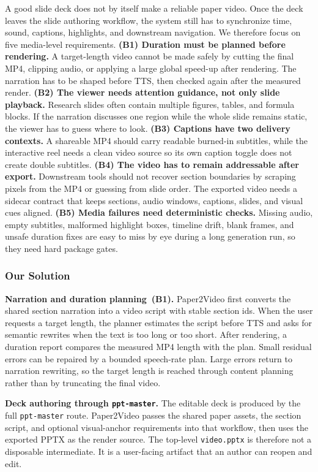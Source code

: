 \documentclass{article}
\begin{document}
A good slide deck does not by itself make a reliable paper video. Once the deck leaves the slide authoring workflow, the system still has to synchronize time, sound, captions, highlights, and downstream navigation. We therefore focus on five media-level requirements. \textbf{(B1) Duration must be planned before rendering.} A target-length video cannot be made safely by cutting the final MP4, clipping audio, or applying a large global speed-up after rendering. The narration has to be shaped before TTS, then checked again after the measured render. \textbf{(B2) The viewer needs attention guidance, not only slide playback.} Research slides often contain multiple figures, tables, and formula blocks. If the narration discusses one region while the whole slide remains static, the viewer has to guess where to look. \textbf{(B3) Captions have two delivery contexts.} A shareable MP4 should carry readable burned-in subtitles, while the interactive reel needs a clean video source so its own caption toggle does not create double subtitles. \textbf{(B4) The video has to remain addressable after export.} Downstream tools should not recover section boundaries by scraping pixels from the MP4 or guessing from slide order. The exported video needs a sidecar contract that keeps sections, audio windows, captions, slides, and visual cues aligned. \textbf{(B5) Media failures need deterministic checks.} Missing audio, empty subtitles, malformed highlight boxes, timeline drift, blank frames, and unsafe duration fixes are easy to miss by eye during a long generation run, so they need hard package gates.

\subsubsection{Our Solution}

\textbf{Narration and duration planning~(B1).} Paper2Video first converts the shared section narration into a video script with stable section ids. When the user requests a target length, the planner estimates the script before TTS and asks for semantic rewrites when the text is too long or too short. After rendering, a duration report compares the measured MP4 length with the plan. Small residual errors can be repaired by a bounded speech-rate plan. Large errors return to narration rewriting, so the target length is reached through content planning rather than by truncating the final video.

\textbf{Deck authoring through \texttt{ppt-master}.} The editable deck is produced by the full \texttt{ppt-master} route. Paper2Video passes the shared paper assets, the section script, and optional visual-anchor requirements into that workflow, then uses the exported PPTX as the render source. The top-level \texttt{video.pptx} is therefore not a disposable intermediate. It is a user-facing artifact that an author can reopen and edit.
\end{document}
